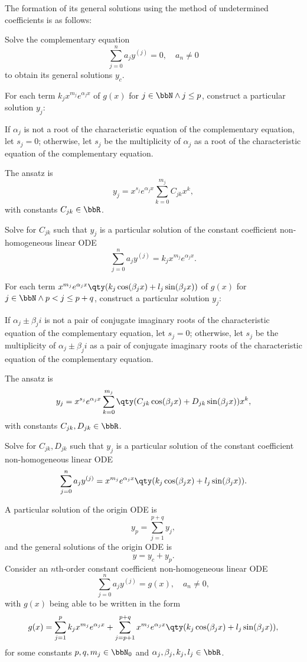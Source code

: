 \documentclass[a4paper,12pt]{report}
\begin{document}
The formation of its general solutions using the method of undetermined coefficients is as follows:
\ben
\item Solve the complementary equation
\[\sum_{j=0}^na_jy^{(j)}=0,\quad a_n\neq 0\]
to obtain its general solutions $y_c$.
\item For each term $k_jx^{m_j}e^{\alpha_jx}$ of $g(x)$ for $j\in\bbN\land j\leq p$, construct a particular solution $y_j$:
\ben
\item If $\alpha_j$ is not a root of the characteristic equation of the complementary equation, let $s_j=0$; otherwise, let $s_j$ be the multiplicity of $\alpha_j$ as a root of the characteristic equation of the complementary equation.
\item The ansatz is
\[y_j=x^{s_j}e^{\alpha_jx}\sum_{k=0}^{m_j}C_{jk}x^k,\]
with constants $C_{jk}\in\bbR$.
\item Solve for $C_{jk}$ such that $y_j$ is a particular solution of the constant coefficient non-homogeneous linear ODE
\[\sum_{j=0}^na_jy^{(j)}=k_jx^{m_j}e^{\alpha_jx}.\]
\een
\item For each term $x^{m_j}e^{\alpha_jx}\qty(k_j\cos(\beta_jx)+l_j\sin(\beta_jx))$ of $g(x)$ for $j\in\bbN\land p<j\leq p+q$, construct a particular solution $y_j$:
\ben
\item If $\alpha_j\pm\beta_ji$ is not a pair of conjugate imaginary roots of the characteristic equation of the complementary equation, let $s_j=0$; otherwise, let $s_j$ be the multiplicity of $\alpha_j\pm\beta_ji$ as a pair of conjugate imaginary roots of the characteristic equation of the complementary equation.
\item The ansatz is
\[y_j=x^{s_j}e^{\alpha_jx}\sum_{k=0}^{m_j}\qty(C_{jk}\cos(\beta_jx)+D_{jk}\sin(\beta_jx))x^k,\]
with constants $C_{jk},D_{jk}\in\bbR$.
\item Solve for $C_{jk},D_{jk}$ such that $y_j$ is a particular solution of the constant coefficient non-homogeneous linear ODE
\[\sum_{j=0}^na_jy^{(j)}=x^{m_j}e^{\alpha_jx}\qty(k_j\cos(\beta_jx)+l_j\sin(\beta_jx)).\]
\een
\item A particular solution of the origin ODE is
\[y_p=\sum_{j=1}^{p+q}y_j,\]
and the general solutions of the origin ODE is
\[y=y_c+y_p.\]
\een
{}
Consider an $n$th-order constant coefficient non-homogeneous linear ODE
\[\sum_{j=0}^na_jy^{(j)}=g(x),\quad a_n\neq 0,\]
with $g(x)$ being able to be written in the form
\[g(x)=\sum_{j=1}^pk_jx^{m_j}e^{\alpha_jx}+\sum_{j=p+1}^{p+q}x^{m_j}e^{\alpha_jx}\qty(k_j\cos(\beta_jx)+l_j\sin(\beta_jx)),\]
for some constants $p,q,m_j\in\bbN_0$ and $\alpha_j,\beta_j,k_j,l_j\in\bbR$.
\end{document}
